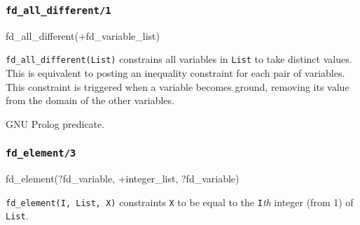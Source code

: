 \subsubsection{\texttt{fd\_all\_different/1}}

\begin{TemplatesOneCol}
fd\_all\_different(+fd\_variable\_list)

\end{TemplatesOneCol}

\Description

\texttt{fd\_all\_different(List)} constrains all variables in \texttt{List}
to take distinct values. This is equivalent to posting an inequality
constraint for each pair of variables. This constraint is triggered when a
variable becomes ground, removing its value from the domain of the other
variables.

\begin{PlErrors}




\end{PlErrors}

\Portability

GNU Prolog predicate.

\subsubsection{\texttt{fd\_element/3}}
\label{fd-element/3}

\begin{TemplatesOneCol}
fd\_element(?fd\_variable, +integer\_list, ?fd\_variable)

\end{TemplatesOneCol}

\Description

\texttt{fd\_element(I, List, X)} constraints \texttt{X} to be equal to the
\texttt{I}\emph{th} integer (from 1) of \texttt{List}.

